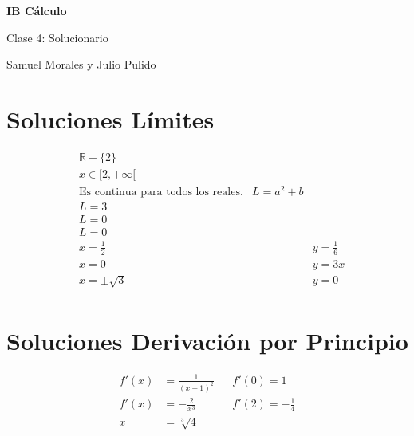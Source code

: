 \documentclass[spanish,12pt]{article}
\begin{document}
	\begin{titlepage}
	\begin{center}
	\hspace{0pt}
	\vfill
	{\Large\textbf{{IB Cálculo}}}
	
	\medskip
	Clase 4: Solucionario
	
	\medskip
    Samuel Morales y Julio Pulido
	
	\thispagestyle{empty}
	\vfill
	\end{center}
	\end{titlepage}
\newpage
\tableofcontents
\newpage
\section{Soluciones Límites}
\begin{align*}
    &\mathbb{R}-\{2\}\\
    &x\in [2,+\infty [\\
    &\text{Es continua para todos los reales.}
    &L=a^2+b\\
    &L=3\\
    &L=0\\
    &L=0\\
    &x=\frac{1}{2} && y=\frac{1}{6}\\
    &x=0 && y=3x \tag{asíntota diagonal}\\
    &x=\pm\sqrt{3} && y=0\\
\end{align*}
\section{Soluciones Derivación por Principio}
\begin{align*}
    f'(x)&=\frac{1}{(x+1)^2} && f'(0)=1\\
    f'(x)&=-\frac{2}{x^3} && f'(2)=-\frac{1}{4}\\
    x&=\sqrt[3]{4}\\
\end{align*}
\end{document}
